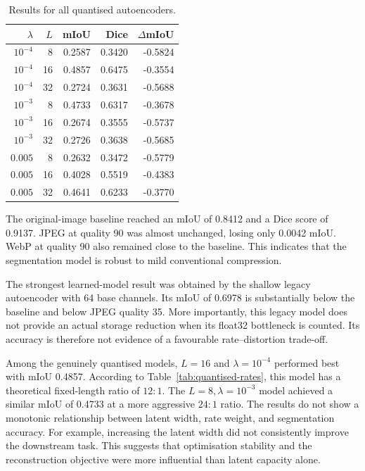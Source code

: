 \documentclass[10pt,a4paper]{article}
\begin{document}
\begin{table}[ht]
\centering
\small
\caption{Results for all quantised autoencoders.}
\begin{tabular}{rrrrr}
\toprule
\(\lambda\) & \(L\) & mIoU & Dice & \(\Delta\)mIoU \\
\midrule
\(10^{-4}\) & 8  & 0.2587 & 0.3420 & -0.5824 \\
\(10^{-4}\) & 16 & 0.4857 & 0.6475 & -0.3554 \\
\(10^{-4}\) & 32 & 0.2724 & 0.3631 & -0.5688 \\
\(10^{-3}\) & 8  & 0.4733 & 0.6317 & -0.3678 \\
\(10^{-3}\) & 16 & 0.2674 & 0.3555 & -0.5737 \\
\(10^{-3}\) & 32 & 0.2726 & 0.3638 & -0.5685 \\
\(0.005\)   & 8  & 0.2632 & 0.3472 & -0.5779 \\
\(0.005\)   & 16 & 0.4028 & 0.5519 & -0.4383 \\
\(0.005\)   & 32 & 0.4641 & 0.6233 & -0.3770 \\
\bottomrule
\end{tabular}
\label{tab:quantised-results}
\end{table}

\clearpage

The original-image baseline reached an mIoU of 0.8412 and a Dice score of
0.9137. JPEG at quality 90 was almost unchanged, losing only 0.0042 mIoU.
WebP at quality 90 also remained close to the baseline. This indicates that
the segmentation model is robust to mild conventional compression.

The strongest learned-model result was obtained by the shallow legacy
autoencoder with 64 base channels. Its mIoU of 0.6978 is substantially below
the baseline and below JPEG quality 35. More importantly, this legacy model
does not provide an actual storage reduction when its float32 bottleneck is
counted. Its accuracy is therefore not evidence of a favourable
rate--distortion trade-off.

Among the genuinely quantised models, \(L=16\) and
\(\lambda=10^{-4}\) performed best with mIoU 0.4857. According to
Table~\ref{tab:quantised-rates}, this model has a theoretical fixed-length ratio of
\(12{:}1\). The \(L=8,\lambda=10^{-3}\) model achieved a similar mIoU of
0.4733 at a more aggressive \(24{:}1\) ratio. The results do not show a
monotonic relationship between latent width, rate weight, and segmentation
accuracy. For example, increasing the latent width did not consistently
improve the downstream task. This suggests that optimisation stability and
the reconstruction objective were more influential than latent capacity
alone.
\end{document}

